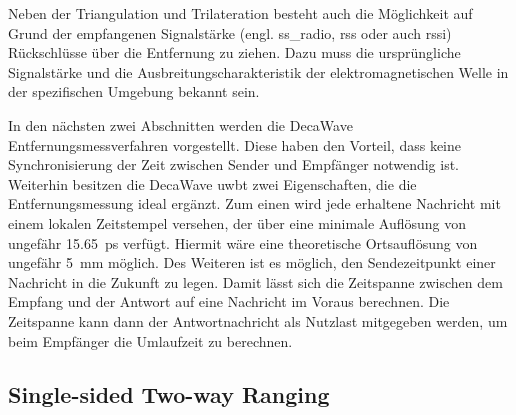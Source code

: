 Neben der Triangulation und Trilateration besteht auch die Möglichkeit auf Grund der empfangenen Signalstärke (engl. \acrfull{ss_radio}, \acrfull{rss} oder auch \acrfull{rssi}) Rückschlüsse über die Entfernung zu ziehen. Dazu muss die ursprüngliche Signalstärke und die Ausbreitungscharakteristik der elektromagnetischen Welle in der spezifischen Umgebung bekannt sein. \cite{gezici2005localization, decawave2014rtls}

In den nächsten zwei Abschnitten werden die DecaWave Entfernungsmessverfahren vorgestellt. Diese haben den Vorteil, dass keine Synchronisierung der Zeit zwischen Sender und Empfänger notwendig ist. Weiterhin besitzen die DecaWave \Gls{uwbt} zwei Eigenschaften, die die Entfernungsmessung ideal ergänzt. Zum einen wird jede erhaltene Nachricht mit einem lokalen Zeitstempel versehen, der über eine minimale Auflösung von ungefähr \SI{15.65}{\pico\second} verfügt. Hiermit wäre eine theoretische Ortsauflösung von ungefähr \SI{5}{\milli\metre} möglich. Des Weiteren ist es möglich, den Sendezeitpunkt einer Nachricht in die Zukunft zu legen. Damit lässt sich die Zeitspanne zwischen dem Empfang und der Antwort auf eine Nachricht im Voraus berechnen. Die Zeitspanne kann dann der Antwortnachricht als Nutzlast mitgegeben werden, um beim Empfänger die Umlaufzeit zu berechnen.


%
%
\subsection{Single-sided Two-way Ranging}

